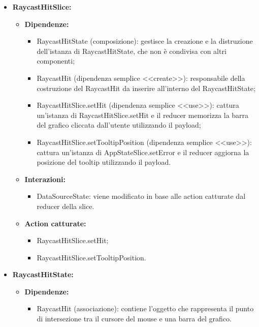 \begin{itemize}
    \item \textbf{RaycastHitSlice:}
          \begin{itemize}
              \item \textbf{Dipendenze:}
                    \begin{itemize}
                        \item RaycastHitState (composizione): gestisce la creazione e la distruzione
                              dell'istanza di RaycastHitState, che non è condivisa con altri componenti;
                        \item RaycastHit (dipendenza semplice <<create>>): responsabile della costruzione del
                              RaycastHit da inserire all'interno del RaycastHitState;
                        \item RaycastHitSlice.setHit (dipendenza semplice <<use>>): cattura un'istanza di
                              RaycastHitSlice.setHit e il reducer memorizza la barra del grafico cliccata
                              dall'utente utilizzando il payload;
                        \item RaycastHitSlice.setTooltipPosition (dipendenza semplice <<use>>): cattura
                              un'istanza di AppStateSlice.setError e il reducer aggiorna la posizione del
                              tooltip utilizzando il payload.
                    \end{itemize}
              \item \textbf{Interazioni:}
                    \begin{itemize}
                        \item DataSourceState: viene modificato in base alle action catturate dal reducer
                              della slice.
                    \end{itemize}
              \item \textbf{Action catturate:}
                    \begin{itemize}
                        \item RaycastHitSlice.setHit;
                        \item RaycastHitSlice.setTooltipPosition.
                    \end{itemize}
          \end{itemize}

    \item \textbf{RaycastHitState:}
          \begin{itemize}
              \item \textbf{Dipendenze:}
                    \begin{itemize}
                        \item RaycastHit (associazione): contiene l'oggetto che rappresenta il punto di
                              intersezione tra il cursore del mouse e una barra del grafico.
                    \end{itemize}
          \end{itemize}


\end{itemize}

